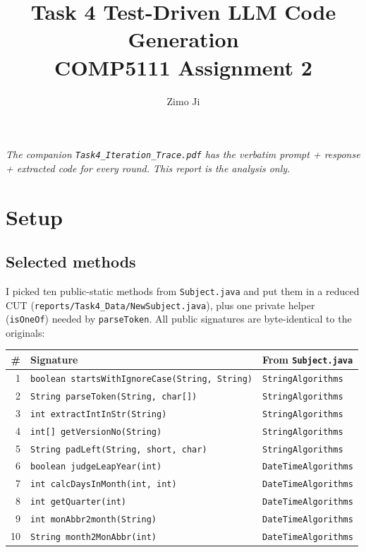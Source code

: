 \documentclass[manuscript,review,nonacm]{acmart}
\title{Task 4 \textendash{} Test-Driven LLM Code Generation\\
       \large COMP5111 Assignment 2}
\author{Zimo Ji}
\affiliation{\institution{HKUST}\city{Hong Kong}\country{Hong Kong SAR}}
\begin{document}
\maketitle
\thispagestyle{plain}

\noindent\textit{The companion \texttt{Task4\_Iteration\_Trace.pdf}
has the verbatim prompt + response + extracted code for every round.
This report is the analysis only.}

\section{Setup}

\subsection{Selected methods}
I picked ten public-static methods from \texttt{Subject.java} and put
them in a reduced CUT (\texttt{reports/Task4\_Data/NewSubject.java}),
plus one private helper (\texttt{isOneOf}) needed by
\texttt{parseToken}. All public signatures are byte-identical to the
originals:

\begin{small}
\begin{tabular}{rll}
\toprule
\# & Signature & From \texttt{Subject.java} \\
\midrule
1  & \texttt{boolean startsWithIgnoreCase(String, String)} & \texttt{StringAlgorithms} \\
2  & \texttt{String  parseToken(String, char[])}           & \texttt{StringAlgorithms} \\
3  & \texttt{int     extractIntInStr(String)}              & \texttt{StringAlgorithms} \\
4  & \texttt{int[]   getVersionNo(String)}                 & \texttt{StringAlgorithms} \\
5  & \texttt{String  padLeft(String, short, char)}         & \texttt{StringAlgorithms} \\
6  & \texttt{boolean judgeLeapYear(int)}                   & \texttt{DateTimeAlgorithms} \\
7  & \texttt{int     calcDaysInMonth(int, int)}            & \texttt{DateTimeAlgorithms} \\
8  & \texttt{int     getQuarter(int)}                      & \texttt{DateTimeAlgorithms} \\
9  & \texttt{int     monAbbr2month(String)}                & \texttt{DateTimeAlgorithms} \\
10 & \texttt{String  month2MonAbbr(int)}                   & \texttt{DateTimeAlgorithms} \\
\bottomrule
\end{tabular}
\end{small}
\end{document}
